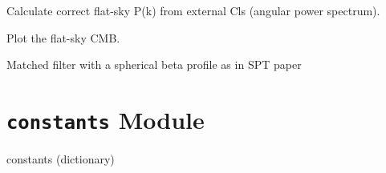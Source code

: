 \documentclass[letterpaper,10pt,english]{sphinxmanual}
\begin{document}
\begin{fulllineitems}
\begin{fulllineitems}
\end{fulllineitems}


\begin{fulllineitems}
\label{PyCosmo:PyCosmo.cmb.CMBFlatMap.beta_profile_map}
\end{fulllineitems}


\begin{fulllineitems}
\label{PyCosmo:PyCosmo.cmb.CMBFlatMap.build_Pk}
Calculate correct flat-sky P(k) from external Cls (angular power spectrum).

\end{fulllineitems}


\begin{fulllineitems}
\label{PyCosmo:PyCosmo.cmb.CMBFlatMap.display}
Plot the flat-sky CMB.

\end{fulllineitems}


\begin{fulllineitems}
\label{PyCosmo:PyCosmo.cmb.CMBFlatMap.matched_filter}
\end{fulllineitems}


\begin{fulllineitems}
\label{PyCosmo:PyCosmo.cmb.CMBFlatMap.matched_filter_Melin}
Matched filter with a spherical beta profile as in SPT paper

\end{fulllineitems}


\end{fulllineitems}



\section{\texttt{constants} Module}
\label{PyCosmo:module-PyCosmo.constants}\label{PyCosmo:constants-module}
constants (dictionary)
\end{document}
